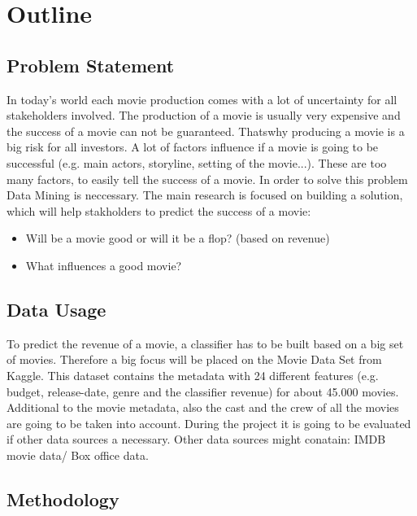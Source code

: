 \chapter{Outline}
\label{cha:intro}


 
\section{Problem Statement}
 In today's world each movie production comes with a lot of uncertainty for all stakeholders involved. The production of a movie is usually very expensive and the success of a movie can not be guaranteed. Thatswhy producing a movie is a big risk for all investors. 
A lot of factors influence if a movie is going to be successful (e.g. main actors, storyline, setting of the movie...). These are too many factors, to easily tell the success of a movie. In order to solve this problem Data Mining is neccessary. 
The main research is focused on building a solution, which will help stakholders to predict the success of a movie:

\begin{itemize}
	\item Will be a movie good or will it be a flop?  (based on revenue)
	\item What influences a good movie?
\end{itemize}


\section{Data Usage}
To predict the revenue of a movie, a classifier has to be built based on a big set of movies. Therefore a big focus will be placed on the Movie Data Set from Kaggle. This dataset contains the metadata with 24 different features (e.g. budget, release-date, genre and the classifier revenue) for about 45.000 movies. Additional to the movie metadata, also the cast and the crew of all the movies are going to be taken into account. During the project it is going to be evaluated if other data sources a necessary. Other data sources might conatain: IMDB movie data/ Box office data.



\section{Methodology}


